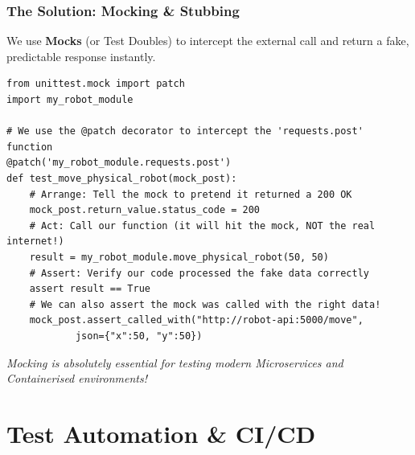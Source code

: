 \documentclass[xcolor=table]{beamer}
\begin{document}
\begin{frame}[fragile]
    \frametitle{The Solution: Mocking \& Stubbing}
    \footnotesize
    We use \textbf{Mocks} (or Test Doubles) to intercept the external call and return a fake, predictable response instantly.
    
    \begin{verbatim}
from unittest.mock import patch
import my_robot_module

# We use the @patch decorator to intercept the 'requests.post' function
@patch('my_robot_module.requests.post')
def test_move_physical_robot(mock_post):
    # Arrange: Tell the mock to pretend it returned a 200 OK
    mock_post.return_value.status_code = 200
    # Act: Call our function (it will hit the mock, NOT the real internet!)
    result = my_robot_module.move_physical_robot(50, 50)
    # Assert: Verify our code processed the fake data correctly
    assert result == True
    # We can also assert the mock was called with the right data!
    mock_post.assert_called_with("http://robot-api:5000/move", 
            json={"x":50, "y":50})
    \end{verbatim}
    \textit{Mocking is absolutely essential for testing modern Microservices and Containerised environments!}
\end{frame}


\section{Test Automation \& CI/CD}
\end{document}
